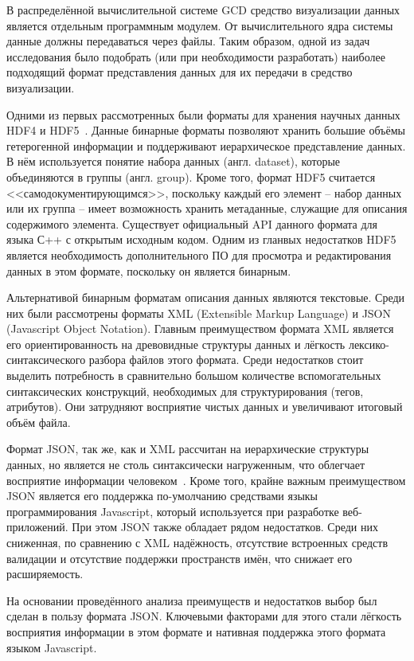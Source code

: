 В распределённой вычислительной системе GCD средство визуализации данных является отдельным программным модулем. От вычислительного ядра системы данные должны передаваться через файлы. Таким образом, одной из задач исследования было подобрать (или при необходимости разработать) наиболее подходящий формат представления данных для их передачи в средство визуализации.

Одними из первых рассмотренных были форматы для хранения научных данных HDF4 и HDF5~\cite{HDFOffCite}. Данные бинарные форматы позволяют хранить большие объёмы гетерогенной информации и поддерживают иерархическое представление данных. В нём используется понятие набора данных (англ. dataset), которые объединяются в группы (англ. group). Кроме того, формат HDF5 считается <<самодокументирующимся>>, поскольку каждый его элемент -- набор данных или их группа -- имеет возможность хранить метаданные, служащие для описания содержимого элемента. Существует официальный API данного формата для языка С++ с открытым исходным кодом. Одним из гланвых недостатков HDF5 является необходимость дополнительного ПО для просмотра и редактирования данных в этом формате, поскольку он является бинарным.

Альтернативой бинарным форматам описания данных являются текстовые. Среди них были рассмотрены форматы XML (Extensible Markup Language) и JSON (Javascript Object Notation). Главным преимуществом формата XML является его ориентированность на древовидные структуры данных и лёгкость лексико-синтаксического разбора файлов этого формата. Среди недостатков стоит выделить потребность в сравнительно большом количестве вспомогательных синтаксических конструкций, необходимых для структурирования (тегов, атрибутов). Они затрудняют восприятие чистых данных и увеличивают итоговый объём файла.

Формат JSON, так же, как и XML рассчитан на иерархические структуры данных, но является не столь синтаксически нагруженным, что облегчает восприятие информации человеком~\cite{JSONvsXML}. Кроме того, крайне важным преимуществом JSON является его поддержка по-умолчанию средствами языкы программирования Javascript, который используется при разработке веб-приложений. При этом JSON также обладает рядом недостатков. Среди них сниженная, по сравнению с XML надёжность, отсутствие встроенных средств валидации и отсутствие поддержки пространств имён, что снижает его расширяемость.

На основании проведённого анализа преимуществ и недостатков выбор был сделан в пользу формата JSON. Ключевыми факторами для этого стали лёгкость восприятия информации в этом формате и нативная поддержка этого формата языком Javascript.

